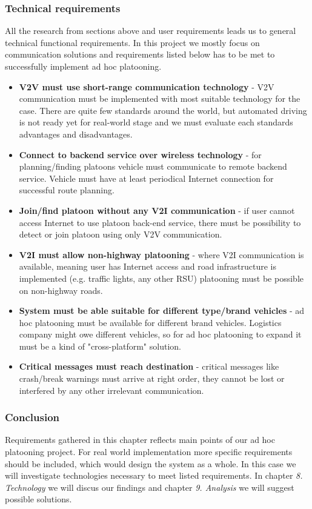 \subsubsection{Technical requirements}
%
All the research from sections above and user requirements leads us to general technical functional requirements. In this project we mostly focus on communication solutions and requirements listed below has to be met to successfully implement ad hoc platooning.
%
\begin{itemize}
    \item\textbf{V2V must use short-range communication technology} - V2V communication must be implemented with most suitable technology for the case. There are quite few standards around the world, but automated driving is not ready yet for real-world stage and we must evaluate each standards advantages and disadvantages.
    \item\textbf{Connect to backend service over wireless technology} - for planning/finding platoons vehicle must communicate to remote backend service. Vehicle must have at least periodical Internet connection for successful route planning.
    \item\textbf{Join/find platoon without any V2I communication} - if user cannot access Internet to use platoon back-end service, there must be possibility to detect or join platoon using only V2V communication.
    \item\textbf{V2I must allow non-highway platooning} - where V2I communication is available, meaning user has Internet access and road infrastructure is implemented (e.g. traffic lights, any other RSU) platooning must be possible on non-highway roads. 
    \item\textbf{System must be able suitable for different type/brand vehicles} - ad hoc platooning must be available for different brand vehicles. Logistics company might owe different vehicles, so for ad hoc platooning to expand it must be a kind of "cross-platform" solution.
    \item\textbf{Critical messages must reach destination} - critical messages like crash/break warnings must arrive at right order, they cannot be lost or interfered by any other irrelevant communication.
\end{itemize}\par
%
\subsubsection{Conclusion}
Requirements gathered in this chapter reflects main points of our ad hoc platooning project. For real world implementation more specific requirements should be included, which would design the system as a whole. In this case we will investigate technologies necessary to meet listed requirements. In chapter \emph{8. Technology} we will discus our findings and chapter \emph{9. Analysis} we will suggest possible solutions.